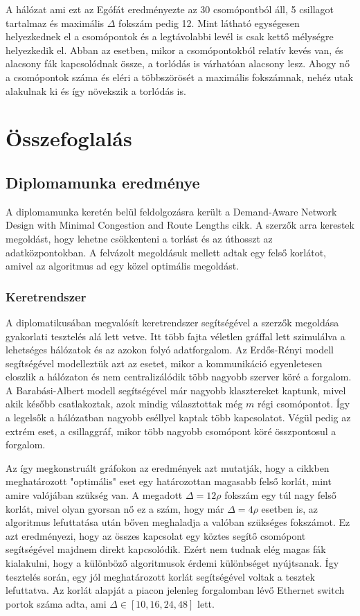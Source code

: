 \documentclass[12pt]{report}
\begin{document}
A hálózat ami ezt az Egófát eredményezte az 30 csomópontból áll, 5 csillagot tartalmaz és maximális $\Delta$ fokszám pedig 12. 
Mint látható egységesen helyezkednek el a csomópontok és a legtávolabbi levél is csak kettő mélységre helyezkedik el.
Abban az esetben, mikor a csomópontokból relatív kevés van, és alacsony fák kapcsolódnak össze, a torlódás is várhatóan alacsony lesz. 
Ahogy nő a csomópontok száma és eléri a többszörösét a maximális fokszámnak, nehéz utak alakulnak ki és így növekszik a torlódás is.

\chapter{Összefoglalás}

\section{Diplomamunka eredménye}

A diplomamunka keretén belül feldolgozásra került a Demand-Aware Network Design with Minimal Congestion and Route Lengths \cite{avin_demand-aware_nodate} cikk.
A szerzők arra kerestek megoldást, hogy lehetne csökkenteni a torlást és az úthosszt az adatközpontokban.
A felvázolt megoldásuk mellett adtak egy felső korlátot, amivel az algoritmus ad egy közel optimális megoldást.

\subsection{Keretrendszer}

A diplomatikusában megvalósít keretrendszer segítségével a szerzők megoldása gyakorlati tesztelés alá lett vetve.
Itt több fajta véletlen gráffal lett szimulálva a lehetséges hálózatok és az azokon folyó adatforgalom.
Az Erdős-Rényi modell segítségével modelleztük azt az esetet, mikor a kommunikáció egyenletesen eloszlik a hálózaton és nem centralizálódik több nagyobb szerver köré a forgalom.
A Barabási-Albert modell segítségével már nagyobb klasztereket kaptunk, mivel akik később csatlakoztak, azok mindig választottak még $m$ régi csomópontot.
Így a legelsők a hálózatban nagyobb eséllyel kaptak több kapcsolatot.
Végül pedig az extrém eset, a csillaggráf, mikor több nagyobb csomópont köré összpontosul a forgalom.

Az így megkonstruált gráfokon az eredmények azt mutatják, hogy a cikkben meghatározott "optimális" eset egy határozottan magasabb felső korlát, mint amire valójában szükség van.
A megadott $\Delta = 12\rho$ fokszám egy túl nagy felső korlát, mivel olyan gyorsan nő ez a szám, hogy már $\Delta = 4\rho$ esetben is, az algoritmus lefuttatása után bőven meghaladja a valóban szükséges fokszámot.
Ez azt eredményezi, hogy az összes kapcsolat egy köztes segítő csomópont segítségével majdnem direkt kapcsolódik.
Ezért nem tudnak elég magas fák kialakulni, hogy a különböző algoritmusok érdemi különbséget nyújtsanak.
Így tesztelés során, egy jól meghatározott korlát segítségével voltak a tesztek lefuttatva. 
Az korlát alapját a piacon jelenleg forgalomban lévő Ethernet switch portok száma adta, ami $\Delta \in [10, 16, 24, 48]$ lett.
\end{document}
